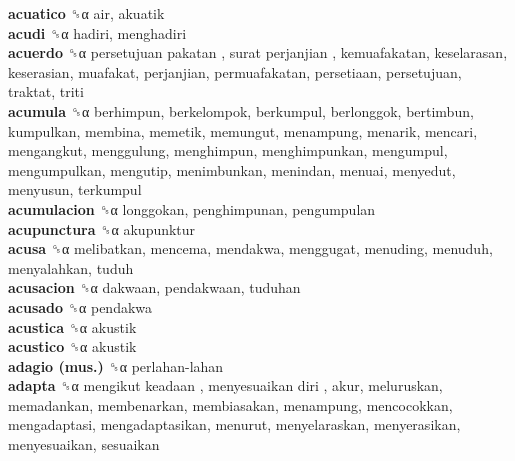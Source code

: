 \textbf{acuatico} ␝α  air, akuatik  \\
\textbf{acudi} ␝α  hadiri, menghadiri  \\
\textbf{acuerdo} ␝α   persetujuan pakatan ,  surat perjanjian , kemuafakatan, keselarasan, keserasian, muafakat, perjanjian, permuafakatan, persetiaan, persetujuan, traktat, triti  \\
\textbf{acumula} ␝α  berhimpun, berkelompok, berkumpul, berlonggok, bertimbun, kumpulkan, membina, memetik, memungut, menampung, menarik, mencari, mengangkut, menggulung, menghimpun, menghimpunkan, mengumpul, mengumpulkan, mengutip, menimbunkan, menindan, menuai, menyedut, menyusun, terkumpul  \\
\textbf{acumulacion} ␝α  longgokan, penghimpunan, pengumpulan  \\
\textbf{acupunctura} ␝α  akupunktur  \\
\textbf{acusa} ␝α  melibatkan, mencema, mendakwa, menggugat, menuding, menuduh, menyalahkan, tuduh  \\
\textbf{acusacion} ␝α  dakwaan, pendakwaan, tuduhan  \\
\textbf{acusado} ␝α  pendakwa  \\
\textbf{acustica} ␝α  akustik  \\
\textbf{acustico} ␝α  akustik  \\
\textbf{adagio (mus.)} ␝α   perlahan-lahan   \\
\textbf{adapta} ␝α   mengikut keadaan ,  menyesuaikan diri , akur, meluruskan, memadankan, membenarkan, membiasakan, menampung, mencocokkan, mengadaptasi, mengadaptasikan, menurut, menyelaraskan, menyerasikan, menyesuaikan, sesuaikan  \\
